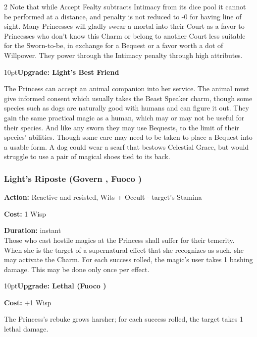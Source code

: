 \begin{multicols}{2}
Note that while Accept Fealty subtracts Intimacy from its dice pool it cannot be performed at a distance, and penalty is not reduced to -0 for having line of sight. Many Princesses will gladly swear a mortal into their Court as a favor to Princesses who don't know this Charm or belong to another Court less suitable for the Sworn-to-be, in exchange for a Bequest or a favor worth a dot of Willpower. They power through the Intimacy penalty through high attributes. 

\begin{myindentpar}{10pt}\textbf{Upgrade: Light's Best Friend}

The Princess can accept an animal companion into her service. The animal must give informed consent which usually takes the Beast Speaker charm, though some species such as dogs are naturally good with humans and can figure it out. They gain the same practical magic as a human, which may or may not be useful for their species. And like any sworn they may use Bequests, to the limit of their species' abilities. Though some care may need to be taken to place a Bequest into a usable form. A dog could wear a scarf that bestows Celestial Grace, but would struggle to use a pair of magical shoes tied to its back.

\end{myindentpar}


\subsubsection*{Light's Riposte (Govern \textbullet\textbullet, Fuoco \textbullet)}

\noindent \textbf{Action:} Reactive and resisted, Wits + Occult - target's Stamina

\noindent \textbf{Cost:} 1 Wisp

\noindent \textbf{Duration:} instant\\

\noindent Those who cast hostile magics at the Princess shall suffer for their temerity. When she is the target of a supernatural effect that she recognizes as such, she may activate the Charm. For each success rolled, the magic's user takes 1 bashing damage. This may be done only once per effect. 

\begin{myindentpar}{10pt}\textbf{Upgrade: Lethal (Fuoco \textbullet\textbullet)}

\noindent \textbf{Cost:} +1 Wisp

The Princess's rebuke grows harsher; for each success rolled, the target takes 1 lethal damage.\end{myindentpar}


\end{multicols}
